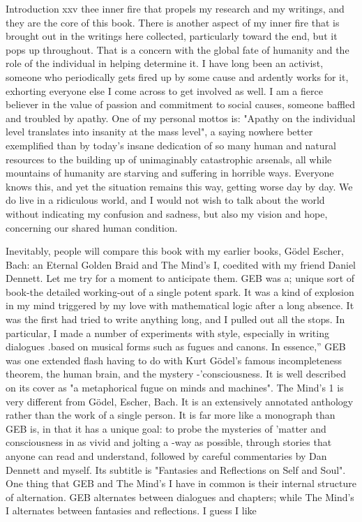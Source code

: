 


Introduction                                                                           xxv thee inner fire that propels my research and my writings, and they are the core of this book. There is another aspect of my inner fire that is brought out in the writings here collected, particularly toward the end, but it pops up throughout. That is a concern with the global fate of humanity and the role of the individual in helping determine it. I have long been an activist, someone who periodically gets fired up by some cause and ardently works for it, exhorting everyone else I come across to get involved as well. I am a fierce believer in the value of passion and commitment to social causes, someone baffled and troubled by apathy. One of my personal mottos is: "Apathy on the individual level translates into insanity at the mass level", a saying nowhere better exemplified than by today's insane dedication of so many human and natural resources to the building up of unimaginably catastrophic arsenals, all while mountains of humanity are starving and suffering in horrible ways. Everyone knows this, and yet the situation remains this way, getting worse day by day. We do live in a ridiculous world, and I would not wish to talk about the world without indicating my confusion and sadness, but also my vision and hope, concerning our shared human condition. 
\separator

Inevitably, people will compare this book with my earlier books, Gödel Escher, Bach: an Eternal Golden Braid and The Mind's I, coedited with my friend Daniel Dennett. Let me try for a moment to anticipate them. GEB was a; unique sort of book-the detailed working-out of a single potent spark. It was a kind of explosion in my mind triggered by my love with mathematical logic after a long absence. It was the first had tried to write anything long, and I pulled out all the stops. In particular, I made a number of experiments with style, especially in writing dialogues .based on musical forms such as fugues and canons. In essence,'' GEB was one extended flash having to do with Kurt Gödel’s famous incompleteness theorem, the human brain, and the mystery -'consciousness. It is well described on its cover as "a metaphorical fugue on minds and machines". The Mind's 1 is very different from Gödel, Escher, Bach. It is an extensively annotated anthology rather than the work of a single person. It is far more like a monograph than GEB is, in that it has a unique goal: to probe the mysteries of 'matter and consciousness in as vivid and jolting a -way as possible, through stories that anyone can read and understand, followed by careful commentaries by Dan Dennett and myself. Its subtitle is "Fantasies and Reflections on Self and Soul". One thing that GEB and The Mind's I have in common is their internal structure of alternation. GEB alternates between dialogues and chapters; while The Mind's I alternates between fantasies and reflections. I guess I like 



